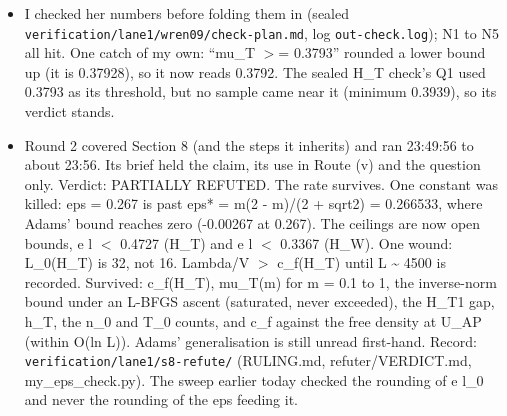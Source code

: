\documentclass[11pt,a4paper]{article}
\begin{document}
\begin{itemize}
\item{} I checked her numbers before folding them in (sealed \texttt{verification/\allowbreak{}lane1/\allowbreak{}wren09/\allowbreak{}check-plan.md}, log \texttt{out-check.log}); N1 to N5
all hit. One catch of my own: ``mu\_T $>$= 0.3793'' rounded a lower bound up (it is 0.37928), so it now reads 0.3792.
The sealed H\_T check's Q1 used 0.3793 as its threshold, but no sample came near it (minimum 0.3939), so its verdict
stands.
\item{} Round 2 covered Section 8 (and the steps it inherits) and ran 23:49:56 to about 23:56. Its brief held the claim, its use
in Route (v) and the question only. Verdict: PARTIALLY REFUTED. The rate survives. One constant was killed: eps = 0.267
is past eps* = m(2 - m)/(2 + sqrt2) = 0.266533, where Adams' bound reaches zero (-0.00267 at 0.267). The ceilings are
now open bounds, e l $<$ 0.4727 (H\_T) and e l $<$ 0.3367 (H\_W). One wound: L\_0(H\_T) is 32, not 16. Lambda/V $>$ c\_f(H\_T)
until L \textasciitilde{} 4500 is recorded. Survived: c\_f(H\_T), mu\_T(m) for m = 0.1 to 1, the inverse-norm bound under an L-BFGS
ascent (saturated, never exceeded), the H\_T1 gap, h\_T, the n\_0 and T\_0 counts, and c\_f against the free density at
U\_AP (within O(ln L)). Adams' generalisation is still unread first-hand. Record:
\texttt{verification/\allowbreak{}lane1/\allowbreak{}s8-refute/\allowbreak{}} (RULING.md, refuter/VERDICT.md, my\_eps\_check.py). The sweep earlier
today checked the rounding of e l\_0 and never the rounding of the eps feeding it.
\end{itemize}
\end{document}
